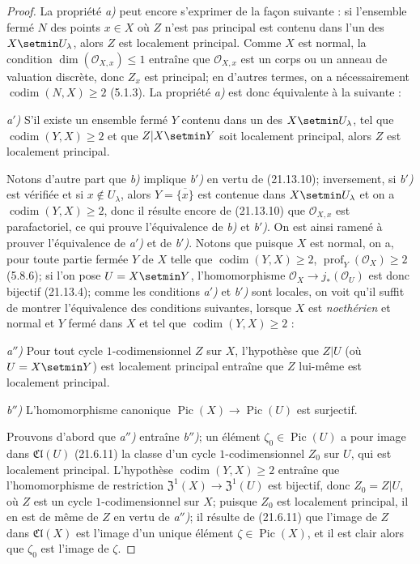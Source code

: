 \begin{proof}
La propriété \emph{a)} peut encore s'exprimer de la façon suivante : si l'ensemble fermé
$N$ des points $x\in X$ où $Z$ n'est pas principal est contenu dans l'un des
$X\setmin U_\lambda$, alors $Z$ est localement principal. Comme $X$ est normal, la condition
$\dim(\mathcal O_{X,x})\leq1$ entraîne que $\mathcal O_{X,x}$ est un corps ou un
anneau de valuation discrète, donc $Z_x$ est principal; en d'autres termes, on a
nécessairement $\operatorname{codim}(N,X)\geq2$ (5.1.3). La propriété \emph{a)} est donc
équivalente à la suivante :

\emph{a$'$)} S'il existe un ensemble fermé $Y$ contenu dans un des $X\setmin U_\lambda$, tel
que $\operatorname{codim}(Y,X)\geq2$ et que $Z|X\setmin Y$ soit localement principal,
alors $Z$ est localement principal.

Notons d'autre part que \emph{b)} implique \emph{b$'$)} en vertu de (21.13.10); inversement, si
\emph{b$'$)} est vérifiée et si $x\notin U_\lambda$, alors $Y=\overline{\{x\}}$ est contenue dans
$X\setmin U_\lambda$ et on a $\operatorname{codim}(Y,X)\geq2$, donc il résulte encore de
(21.13.10) que $\mathcal O_{X,x}$ est parafactoriel, ce qui prouve l'équivalence de
\emph{b)} et \emph{b$'$)}. On est ainsi ramené à prouver l'équivalence de \emph{a$'$)} et de \emph{b$'$)}.
Notons que puisque $X$ est normal, on a, pour toute partie fermée $Y$ de $X$ telle que
$\operatorname{codim}(Y,X)\geq2$, $\operatorname{prof}_Y(\mathcal O_X)\geq2$
(5.8.6); si l'on pose $U=X\setmin Y$, l'homomorphisme
$\mathcal O_X\to j_*(\mathcal O_U)$ est donc bijectif (21.13.4); comme les conditions
\emph{a$'$)} et \emph{b$'$)} sont locales, on voit qu'il suffit de montrer l'équivalence des
conditions suivantes, lorsque $X$ est \emph{noethérien} et normal et $Y$ fermé dans $X$ et
tel que $\operatorname{codim}(Y,X)\geq2$ :

\emph{a$''$)} Pour tout cycle $1$-codimensionnel $Z$ sur $X$, l'hypothèse que $Z|U$
(où $U=X\setmin Y$) est localement principal entraîne que $Z$ lui-même est localement
principal.

\emph{b$''$)} L'homomorphisme canonique
$\operatorname{Pic}(X)\to\operatorname{Pic}(U)$ est surjectif.

Prouvons d'abord que \emph{a$''$)} entraîne \emph{b$''$)}; un élément
$\zeta_0\in\operatorname{Pic}(U)$ a pour image dans $\mathfrak{Cl}(U)$ (21.6.11) la
classe d'un cycle $1$-codimensionnel $Z_0$ sur $U$, qui est localement principal.
L'hypothèse $\operatorname{codim}(Y,X)\geq2$ entraîne que l'homomorphisme de
restriction $\mathfrak{Z}^1(X)\to\mathfrak{Z}^1(U)$ est bijectif, donc $Z_0=Z|U$, où $Z$
est un cycle $1$-codimensionnel sur $X$; puisque $Z_0$ est localement principal, il en
est de même de $Z$ en vertu de \emph{a$''$)}; il résulte de (21.6.11) que l'image de $Z$ dans
$\mathfrak{Cl}(X)$ est l'image d'un unique élément $\zeta\in\operatorname{Pic}(X)$,
et il est clair alors que $\zeta_0$ est l'image de $\zeta$.


\end{proof}
